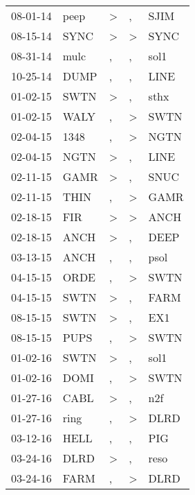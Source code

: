 \begin{supertabular}{lllll}
 08-01-14 &   peep &     \textgreater &                , &   SJIM \\
 08-15-14 &   SYNC &     \textgreater &     \textgreater &   SYNC \\
 08-31-14 &   mulc &                , &                , &   sol1 \\
 10-25-14 &   DUMP &                , &                , &   LINE \\
 01-02-15 &   SWTN &     \textgreater &                , &   sthx \\
 01-02-15 &   WALY &                , &     \textgreater &   SWTN \\
 02-04-15 &   1348 &                , &     \textgreater &   NGTN \\
 02-04-15 &   NGTN &     \textgreater &                , &   LINE \\
 02-11-15 &   GAMR &     \textgreater &                , &   SNUC \\
 02-11-15 &   THIN &                , &     \textgreater &   GAMR \\
 02-18-15 &    FIR &     \textgreater &     \textgreater &   ANCH \\
 02-18-15 &   ANCH &     \textgreater &                , &   DEEP \\
 03-13-15 &   ANCH &                , &                , &   psol \\
 04-15-15 &   ORDE &                , &     \textgreater &   SWTN \\
 04-15-15 &   SWTN &     \textgreater &                , &   FARM \\
 08-15-15 &   SWTN &     \textgreater &                , &    EX1 \\
 08-15-15 &   PUPS &                , &     \textgreater &   SWTN \\
 01-02-16 &   SWTN &     \textgreater &                , &   sol1 \\
 01-02-16 &   DOMI &                , &     \textgreater &   SWTN \\
 01-27-16 &   CABL &     \textgreater &                , &    n2f \\
 01-27-16 &   ring &                , &     \textgreater &   DLRD \\
 03-12-16 &   HELL &                , &                , &    PIG \\
 03-24-16 &   DLRD &     \textgreater &                , &   reso \\
 03-24-16 &   FARM &                , &     \textgreater &   DLRD \\

\end{supertabular}
